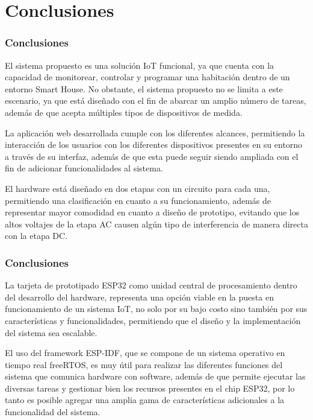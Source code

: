 \section{Conclusiones}
\begin{frame}[t]
\frametitle{Conclusiones}
\small
	El sistema propuesto es una solución IoT funcional, ya que cuenta con la capacidad de monitorear, controlar y programar una habitación dentro de un entorno Smart House. No obstante, el sistema propuesto no se limita a este escenario, ya que está diseñado con el fin de abarcar un amplio número de tareas, además de que acepta múltiples tipos de dispositivos de medida.\newline
	
	La aplicación web desarrollada cumple con los diferentes alcances, permitiendo la interacción de los usuarios con los diferentes dispositivos presentes en su entorno a través de su interfaz, además de que esta puede seguir siendo ampliada con el fin de adicionar funcionalidades al sistema.\newline
	
	El hardware está diseñado en dos etapas con un circuito para cada una, permitiendo una clasificación en cuanto a su funcionamiento, además de representar mayor comodidad en cuanto a diseño de prototipo, evitando que los altos voltajes de la etapa AC causen algún tipo de interferencia de manera directa con la etapa DC. \\
\end{frame}

\begin{frame}[t]
\frametitle{Conclusiones}
	La tarjeta de prototipado ESP32 como unidad central de procesamiento dentro del desarrollo del hardware, representa una opción viable en la puesta en funcionamiento de un sistema IoT, no solo por su bajo costo sino también por sus características y funcionalidades, permitiendo que el diseño y la implementación del sistema sea escalable.\newline
	
	El uso del framework ESP-IDF, que se compone de un sistema operativo en tiempo real freeRTOS, es muy útil para realizar las diferentes funciones del sistema que comunica hardware con software, además de que permite ejecutar las diversas tareas y gestionar bien los recursos presentes en el chip ESP32, por lo tanto es posible agregar una amplia gama de características adicionales a la funcionalidad del sistema.\\
	
\end{frame}